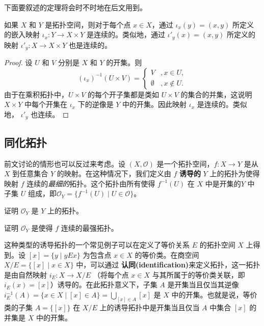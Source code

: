 下面要叙述的定理将会时不时地在后文用到。

\begin{theorem}\label{thm:10.3}
	如果 $X$ 和 $Y$ 是拓扑空间，则对于每个点 $x\in X$，通过 $\iota _{x} (y)=(x,y)$ 所定义的嵌入映射 $\iota _{x} :Y\rightarrow X\times Y$  是连续的。类似地，通过 $\iota '_{y} (x)=(x,y)$ 所定义的映射 $\iota '_{y} :X\rightarrow X\times Y$  也是连续的。
\end{theorem}

\begin{proof}
	设 $U$ 和 $V$ 分别是 $X$ 和 $Y$ 的开集。则
\begin{equation*}
( \iota _{x})^{-1} (U\times V)=\begin{cases}
V & ,x\in U,\\
\emptyset  & ,x\notin U.
\end{cases}
\end{equation*}
由于在乘积拓扑中，$U\times V$ 的每个开子集都是类如 $U\times V$ 的集合的并集，这说明 $X\times Y$ 中每个开集在 $\iota _{x}$ 下的逆像是 $Y$ 中的开集。因此映射 $\iota _{x}$ 是连续的。类似地， $\iota '_{y}$ 也连续。
\end{proof}	

\subsection{同化拓扑}

	前文讨论的情形也可以反过来考虑。设 $(X,\mathcal{O} )$ 是一个拓扑空间，$f:X\rightarrow Y$ 是从 $X$ 到任意集合 $Y$ 的映射。在这种情况下，我们定义由 $f$ \textbf{诱导的} $Y$ 上的拓扑为使得映射 $f$ 连续的\emph{最细的}拓扑。这个拓扑由所有使得 $f^{-1} (U)$ 在 $X$ 中是开集的$Y$ 中子集 $U$ 组成，即$\mathcal{O}_{Y} =\{f^{-1} (U)\mid U\in \mathcal{O} \}$。

\begin{exercise}
	证明 $\mathcal{O}_{Y}$ 是 $Y$ 上的拓扑。
\end{exercise}

\begin{exercise}
	证明 $\mathcal{O}_{Y}$ 是使得 $f$ 连续的最强拓扑。
\end{exercise}

	这种类型的诱导拓扑的一个常见例子可以在定义了等价关系 $E$ 的拓扑空间 $X$ 上得到。设 $[x]=\{y\mid yEx\}$ 为包含点 $x\in X$ 的等价类。在商空间 $X/E=\{[x]\mid x\in X\}$ 中，可以通过 \textbf{认同(identification)}来定义拓扑，这一拓扑是由自然映射 $i_{E} :X\rightarrow X/E$ （将每个点 $x\in X$ 与其所属于的等价类关联，即 $i_{E} (x)=[x]$）诱导的。在此拓扑意义下，子集 $A$ 是开集当且仅当其逆像 $i_{E}^{-1} (A)=\{x\in X\mid [x]\in A\}=\bigcup _{[ x] \in A}[ x]$ 是 $X$ 中的开集。也就是说，等价类的子集 $A=\{[x]\}$ 在 $X/E$ 上的诱导拓扑中是开集当且仅当 $A$ 中集合 $[x]$ 的并集是 $X$ 中的开集。

